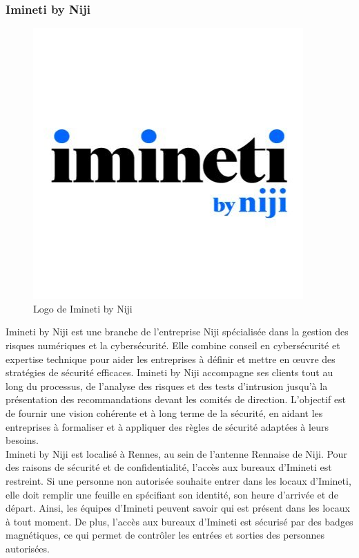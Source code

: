 \documentclass[12pt]{article}
\begin{document}
\subsubsection{Imineti by Niji}
\begin{figure}
    \centering
    \includegraphics[width=0.85\linewidth]{img/imineti.jpg} 
    \caption{Logo de Imineti by Niji}
    \label{fig:wrapfig}
\end{figure}
Imineti by Niji est une branche de l'entreprise Niji spécialisée dans la gestion des risques numériques et la cybersécurité. Elle combine conseil en cybersécurité et expertise technique pour aider les entreprises à définir et mettre en œuvre des stratégies de sécurité efficaces. Imineti by Niji accompagne ses clients tout au long du processus, de l'analyse des risques et des tests d'intrusion jusqu'à la présentation des recommandations devant les comités de direction. L'objectif est de fournir une vision cohérente et à long terme de la sécurité, en aidant les entreprises à formaliser et à appliquer des règles de sécurité adaptées à leurs besoins.
\\
Imineti by Niji est localisé à Rennes, au sein de l'antenne Rennaise de Niji. Pour des raisons de sécurité et de confidentialité, l'accès aux bureaux d'Imineti est restreint. Si une personne non autorisée souhaite entrer dans les locaux d'Imineti, elle doit remplir une feuille en spécifiant son identité, son heure d'arrivée et de départ. Ainsi, les équipes d'Imineti peuvent savoir qui est présent dans les locaux à tout moment. De plus, l'accès aux bureaux d'Imineti est sécurisé par des badges magnétiques, ce qui permet de contrôler les entrées et sorties des personnes autorisées.
\newpage
\end{document}
